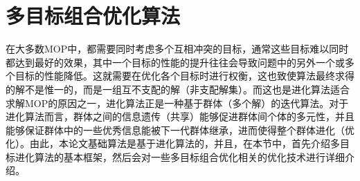 \section{多目标组合优化算法}
\label{sec:背景介绍:多目标组合优化算法}
在大多数MOP中，都需要同时考虑多个互相冲突的目标，通常这些目标难以同时都达到最好的效果，其中一个目标的性能的提升往往会导致问题中的另外一个或多个目标的性能降低。这就需要在优化各个目标时进行权衡，这也致使算法最终求得的解不是惟一的，而是一组互不支配的解（非支配解集）。而这也是进化算法适合求解MOP的原因之一，进化算法正是一种基于群体（多个解）的迭代算法。对于进化算法而言，群体之间的信息遗传（共享）能够促进群体间个体的多元性，并且能够保证群体中的一些优秀信息能被下一代群体继承，进而使得整个群体进化（优化）。由此，本论文基础算法是基于进化算法的，并且，在本节中，首先介绍多目标进化算法的基本框架，然后会对一些多目标组合优化相关的优化技术进行详细介绍。

